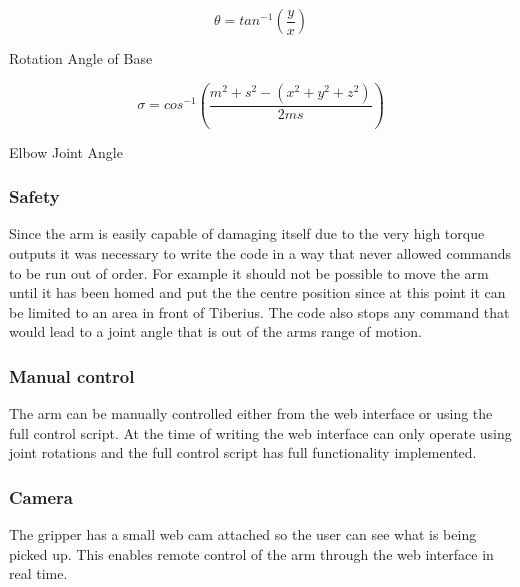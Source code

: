 \begin{capequ}[!htb]
\begin{center}
\begin{equation}
\theta = tan^{-1}\left (  \frac{y}{x}\right )
\end{equation}
\caption{Rotation Angle of Base}
\label{Equation4}
\end{center}
\end{capequ}

\begin{capequ}[!htb]
\begin{center}
\begin{equation}
\sigma = cos^{-1}\left (\frac{m^{2}+s^{2}-(x^{2}+y^{2}+z^{2})}{2ms} \right )
\end{equation}
\caption{Elbow Joint Angle}
\label{Equation5}
\end{center}
\end{capequ}

\subsubsection{Safety}
Since the arm is easily capable of damaging itself due to the very high torque outputs it was necessary to write the code in a way that never allowed commands to be run out of order. For example it should not be possible to move the arm until it has been homed and put the the centre position since at this point it can be limited to an area in front of Tiberius. The code also stops any command that would lead to a joint angle that is out of the arms range of motion.

\subsubsection{Manual control}
The arm can be manually controlled either from the web interface or using the full control script. At the time of writing the web interface can only operate using joint rotations and the full control script has full functionality implemented.

\subsubsection{Camera}
The gripper has a small web cam attached so the user can see what is being picked up. This enables remote control of the arm through the web interface in real time.
